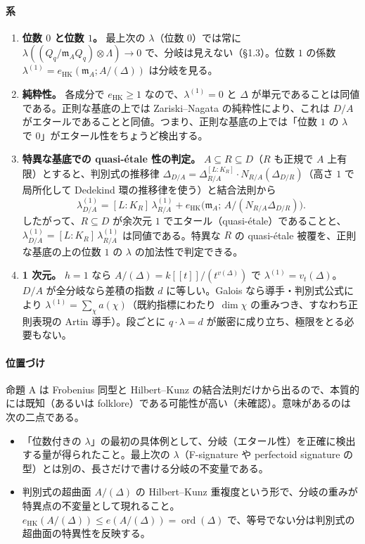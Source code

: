\documentclass[11pt,a4paper]{ltjsarticle}
\theoremstyle{plain}
\theoremstyle{definition}
\theoremstyle{remark}
\theoremstyle{plain}
\newcommand{\m}{\mathfrak{m}}
\newcommand{\eHK}{e_{\mathrm{HK}}}
\begin{document}
\paragraph{系}
\begin{enumerate}
  \item \textbf{位数 $0$ と位数 $1$。} 最上次の $\lambda$（位数 $0$）では常に $\lambda((Q_q/\m_AQ_q)\otimes\Lambda)\to0$ で、分岐は見えない（\S 1.3）。位数 $1$ の係数 $\lambda^{(1)} = \eHK(\m_A;A/(\Delta))$ は分岐を見る。
  \item \textbf{純粋性。} 各成分で $\eHK\ge1$ なので、$\lambda^{(1)} = 0$ と $\Delta$ が単元であることは同値である。正則な基底の上では Zariski--Nagata の純粋性により、これは $D/A$ がエタールであることと同値。つまり、正則な基底の上では「位数 $1$ の $\lambda$ で $0$」がエタール性をちょうど検出する。
  \item \textbf{特異な基底での quasi-étale 性の判定。} $A\subseteq R\subseteq D$（$R$ も正規で $A$ 上有限）とすると、判別式の推移律 $\Delta_{D/A} = \Delta_{R/A}^{[L:K_R]}\cdot N_{R/A}(\Delta_{D/R})$（高さ $1$ で局所化して Dedekind 環の推移律を使う）と結合法則から
  \[
    \lambda^{(1)}_{D/A} = [L:K_R]\,\lambda^{(1)}_{R/A} + \eHK\bigl(\m_A;\,A/(N_{R/A}\Delta_{D/R})\bigr).
  \]
  したがって、$R\subseteq D$ が余次元 $1$ でエタール（quasi-étale）であることと、$\lambda^{(1)}_{D/A} = [L:K_R]\,\lambda^{(1)}_{R/A}$ は同値である。特異な $R$ の quasi-étale 被覆を、正則な基底の上の位数 $1$ の $\lambda$ の加法性で判定できる。
  \item \textbf{1 次元。} $h = 1$ なら $A/(\Delta) = k[[t]]/(t^{v(\Delta)})$ で $\lambda^{(1)} = v_t(\Delta)$。$D/A$ が全分岐なら差積の指数 $d$ に等しい。Galois なら導手・判別式公式により $\lambda^{(1)} = \sum_\chi a(\chi)$（既約指標にわたり $\dim\chi$ の重みつき、すなわち正則表現の Artin 導手）。段ごとに $q\cdot\lambda = d$ が厳密に成り立ち、極限をとる必要もない。
\end{enumerate}

\paragraph{位置づけ}
命題 A は Frobenius 同型と Hilbert--Kunz の結合法則だけから出るので、本質的には既知（あるいは folklore）である可能性が高い（未確認）。意味があるのは次の二点である。
\begin{itemize}
  \item 「位数付きの $\lambda$」の最初の具体例として、分岐（エタール性）を正確に検出する量が得られたこと。最上次の $\lambda$（F-signature や perfectoid signature の型）とは別の、長さだけで書ける分岐の不変量である。
  \item 判別式の超曲面 $A/(\Delta)$ の Hilbert--Kunz 重複度という形で、分岐の重みが特異点の不変量として現れること。$\eHK(A/(\Delta))\le e(A/(\Delta)) = \operatorname{ord}(\Delta)$ で、等号でない分は判別式の超曲面の特異性を反映する。
\end{itemize}
\end{document}
